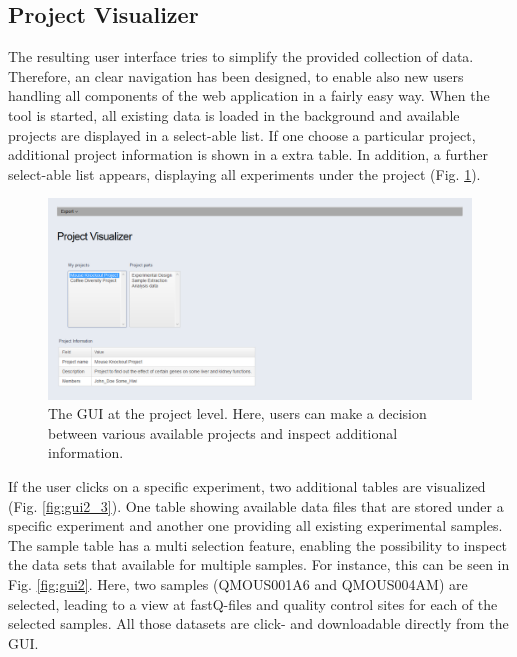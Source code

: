 \documentclass[a4paper, 11pt]{article}
\begin{document}
\subsection{Project Visualizer}
The resulting user interface tries to simplify the provided collection of data. Therefore, an clear navigation has been designed, to enable also new users handling all components of the web application in a fairly easy way. When the tool is started, all existing data is loaded in the background and available projects are displayed in a select-able list. If one choose a particular project, additional project information is shown in a extra table. In addition, a further select-able list appears, displaying all experiments under the project (Fig. \ref{fig:gui1}).
\begin{figure}[H]
\centering
\includegraphics[scale=0.30]{GUI_1.png}
\caption[The GUI at the projet level]{The GUI at the project level. Here, users can make a decision between various available projects and inspect additional information.}
\label{fig:gui1}
\end{figure}
\noindent
If the user clicks on a specific experiment, two additional tables are visualized (Fig. \ref{fig:gui2_3}). One table showing available data files that are stored under a specific experiment and another one providing all existing experimental samples. The sample table has a multi selection feature, enabling the possibility to inspect the data sets that available for multiple samples. For instance, this can be seen in Fig. \ref{fig:gui2}. Here, two samples (QMOUS001A6 and QMOUS004AM) are selected, leading to a view at fastQ-files and quality control sites for each of the selected samples. All those datasets are click- and downloadable directly from the GUI.  
\end{document}
